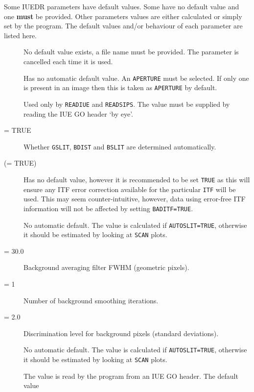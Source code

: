 Some IUEDR parameters have default values.  Some have no default value and one
{\bf must} be provided.  Other parameters values are either calculated or
simply set by the program.  The default values and/or behaviour of each
parameter are listed here.

\begin {description}

\item [] \lmbox
   No default value exists, a file name must be provided.
   The parameter is cancelled each time it is used.
\item [] \lmbox
   Has no automatic default value.  An \verb+APERTURE+ must be selected.
   If only one is present in an image then this is taken as \verb+APERTURE+ by
   default.
\item [] \lmbox
   Used only by \verb+READIUE+ and \verb+READSIPS+\@.  The value must be
   supplied by reading the IUE GO header `by eye'.
\item [ = TRUE] \lmbox
   Whether \verb+GSLIT+, \verb+BDIST+ and \verb+BSLIT+ are determined
   automatically.
\item [ (= TRUE)] \lmbox
   Has no default value, however it is recommended to be set \verb+TRUE+ as
   this will ensure any ITF error correction available for the particular
   \verb+ITF+ will be used.
   This may seem counter-intuitive, however, data using error-free ITF
   information will not be affected by setting \verb+BADITF=TRUE+\@.
\item [] \lmbox
   No automatic default.  The value is calculated if \verb+AUTOSLIT=TRUE+,
   otherwise it should be estimated by looking at \verb+SCAN+ plots.
\item [ = 30.0] \lmbox
   Background averaging filter FWHM (geometric pixels).
\item [ = 1] \lmbox
   Number of background smoothing iterations.
\item [ = 2.0] \lmbox
   Discrimination level for background pixels (standard deviations).
\item [] \lmbox
   No automatic default.  The value is calculated if \verb+AUTOSLIT=TRUE+,
   otherwise it should be estimated by looking at \verb+SCAN+ plots.
\item [] \lmbox
   The value is read by the program from an IUE GO header.  The default value

\end{description}
